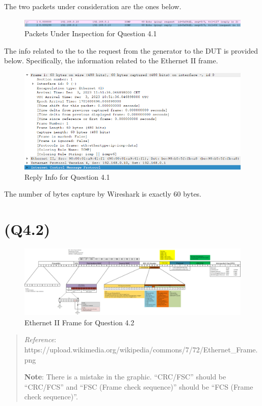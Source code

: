 The two packets under consideration are the ones below.

\begin{figure}
\centering
\includegraphics{data/q4.1-packets-under-inspection.png}
\caption{Packets Under Inspection for Question 4.1}
\end{figure}

The info related to the to the request from the generator to the DUT is
provided below. Specifically, the information related to the Ethernet II
frame.

\begin{figure}
\centering
\includegraphics{data/q4.1-request-info.png}
\caption{Reply Info for Question 4.1}
\end{figure}

The number of bytes capture by Wireshark is exactly \(60\) bytes.

\hypertarget{q4.2}{%
\section{(Q4.2)}\label{q4.2}}

\begin{figure}
\centering
\includegraphics{data/q4.2-ethernet-diagram.png}
\caption{Ethernet II Frame for Question 4.2}
\end{figure}

\begin{quote}
\emph{Reference}:
https://upload.wikimedia.org/wikipedia/commons/7/72/Ethernet\_Frame.png

\textbf{Note}: There is a mistake in the graphic. ``CRC/FSC'' should be
``CRC/FCS'' and ``FSC (Frame check sequence)'' should be ``FCS (Frame
check sequence)''.
\end{quote}

